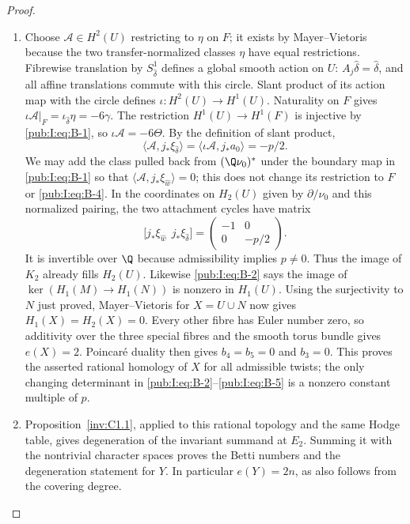 \begin{proof}
\begin{enumerate}[label=\arabic*.,leftmargin=*]
\item Choose $\mathcal A\in H^2(U)$ restricting to $\eta$ on $F$;
it exists by Mayer--Vietoris because the two transfer-normalized
classes $\eta$ have equal restrictions. Fibrewise translation by
$S^1_{\hat\delta}$ defines a global smooth action on $U$:
$A_j\hat\delta=\hat\delta$, and all affine translations commute
with this circle. Slant product of its action map with the circle
defines $\iota:H^2(U)\to H^1(U)$. Naturality on $F$ gives
$\iota\mathcal A|_F=\iota_{\hat\delta}\eta=-6\gamma$.
The restriction $H^1(U)\to H^1(F)$ is injective by \eqref{pub:I:eq:B-1}, so
$\iota\mathcal A=-6\Theta$. By the definition of slant product,
\begin{equation}
 \langle\mathcal A,j_*\xi_{\hat\delta}\rangle
 =\langle\iota\mathcal A,j_*a_0\rangle=-p/2.
\label{pub:I:eq:B-4}
\end{equation}
We may add the class pulled back from $(\Q\nu_0)^*$ under
the boundary map in \eqref{pub:I:eq:B-1} so that
$\langle\mathcal A,j_*\xi_{\hat w}\rangle=0$;
this does not change its restriction to $F$ or \eqref{pub:I:eq:B-4}.
In the coordinates on $H_2(U)$ given by $\partial/\nu_0$ and
this normalized pairing, the two attachment cycles have
matrix
\begin{equation}
 \bigl[j_*\xi_{\hat w}\ \ j_*\xi_{\hat\delta}\bigr]
 =\begin{pmatrix}-1&0\\0&-p/2\end{pmatrix}.
\label{pub:I:eq:B-5}
\end{equation}
It is invertible over $\Q$ because admissibility implies
$p\ne0$. Thus the image of $K_2$ already fills $H_2(U)$.
Likewise \eqref{pub:I:eq:B-2} says the image of $\ker(H_1(M)\to H_1(N))$
is nonzero in $H_1(U)$. Using the surjectivity to $N$ just proved,
Mayer--Vietoris for $X=U\cup N$ now gives $H_1(X)=H_2(X)=0$.
Every other fibre has Euler number zero, so additivity over the
three special fibres and the smooth torus bundle gives $e(X)=2$.
Poincar\'e duality then gives $b_4=b_5=0$ and $b_3=0$.
This proves the asserted rational homology of $X$ for all admissible
twists; the only changing determinant in \eqref{pub:I:eq:B-2}--\eqref{pub:I:eq:B-5} is a nonzero
constant multiple of $p$. 

\item Proposition~\ref{inv:C1.1}, applied to this rational topology and
the same Hodge table, gives degeneration of the invariant summand at $E_2$.
Summing it with the nontrivial character spaces proves the Betti
numbers and the degeneration statement for $Y$. In particular
$e(Y)=2n$, as also follows from the covering degree.
\end{enumerate}
\end{proof}